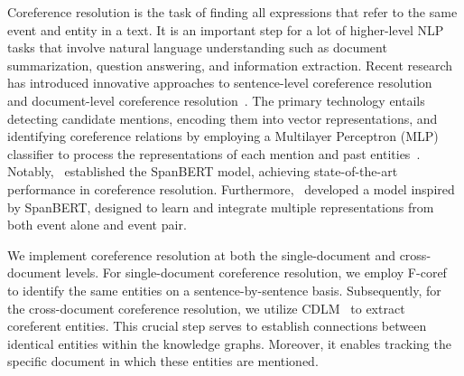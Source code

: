 Coreference resolution is the task of finding all expressions that refer to the same event and entity in a text. It is an important step for a lot of higher-level NLP tasks that involve natural language understanding such as document summarization, question answering, and information extraction. Recent research has introduced innovative approaches to sentence-level coreference resolution~\cite{grenander2023sentenceincremental,10.1162/tacl_a_00543} and document-level coreference resolution~\cite{10.1145/3539597.3573038,10.1007/978-3-031-40286-9_34}. The primary technology entails detecting candidate mentions, encoding them into vector representations, and identifying coreference relations by employing a Multilayer Perceptron (MLP) classifier to process the representations of each mention and past entities~\cite{Liu2023il}. Notably,~\citet{joshi2020spanbert} established the SpanBERT model, achieving state-of-the-art performance in coreference resolution. Furthermore,~\citet{yao-etal-2023-learning} developed a model inspired by SpanBERT, designed to learn and integrate multiple representations from both event alone and event pair. 

We implement coreference resolution at both the single-document and cross-document levels. For single-document coreference resolution, we employ F-coref~\cite{otmazgin2022fcoref} to identify the same entities on a sentence-by-sentence basis. Subsequently, for the cross-document coreference resolution, we utilize CDLM~\cite{caciularu-etal-2021-cdlm-cross} to extract coreferent entities. This crucial step serves to establish connections between identical entities within the knowledge graphs. Moreover, it enables tracking the specific document in which these entities are mentioned.

